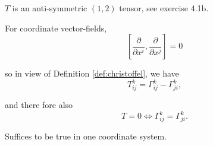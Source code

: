 $T$ is an anti-symmetric $(1,2)$ tensor, see exercise 4.1b.

\begin{colremark}

For coordinate vector-fields,
$$\left[\frac{\partial}{\partial x^i}, \frac{\partial}{\partial x^j}\right] = 0$$


so in view of Definition \ref{def:christoffel}, we have
$$T_{ij}^k = \Gamma_{ij}^k - \Gamma_{ji}^k,$$

and there fore also
$$
T = 0 \iff \Gamma_{ij}^k = \Gamma_{ji}^k.
$$

Suffices to be true in one coordinate system.

\end{colremark}

